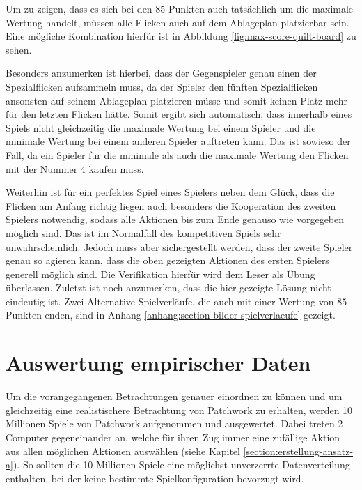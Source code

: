 Um zu zeigen, dass es sich bei den $85$ Punkten auch tatsächlich um die maximale Wertung handelt, müssen alle Flicken auch auf dem Ablageplan platzierbar sein. Eine mögliche Kombination hierfür ist in Abbildung \ref{fig:max-score-quilt-board} zu sehen.

Besonders anzumerken ist hierbei, dass der Gegenspieler genau einen der Spezialflicken aufsammeln muss, da der Spieler den fünften Spezialflicken ansonsten auf seinem Ablageplan platzieren müsse und somit keinen Platz mehr für den letzten Flicken hätte. Somit ergibt sich automatisch, dass innerhalb eines Spiels nicht gleichzeitig die maximale Wertung bei einem Spieler und die minimale Wertung bei einem anderen Spieler auftreten kann. Das ist sowieso der Fall, da ein Spieler für die minimale als auch die maximale Wertung den Flicken mit der Nummer 4 kaufen muss.

Weiterhin ist für ein perfektes Spiel eines Spielers neben dem Glück, dass die Flicken am Anfang richtig liegen auch besonders die Kooperation des zweiten Spielers notwendig, sodass alle Aktionen bis zum Ende genauso wie vorgegeben möglich sind. Das ist im Normalfall des kompetitiven Spiels sehr unwahrscheinlich. Jedoch muss aber sichergestellt werden, dass der zweite Spieler genau so agieren kann, dass die oben gezeigten Aktionen des ersten Spielers generell möglich sind. Die Verifikation hierfür wird dem Leser als Übung überlassen. Zuletzt ist noch anzumerken, dass die hier gezeigte Lösung nicht eindeutig ist. Zwei Alternative Spielverläufe, die auch mit einer Wertung von $85$ Punkten enden, sind in Anhang \ref{anhang:section-bilder-spielverlaeufe} gezeigt.

\pagebreak

\section{Auswertung empirischer Daten}
\label{section:auswertung-empirischer-daten}

Um die vorangegangenen Betrachtungen genauer einordnen zu können und um gleichzeitig eine realistischere Betrachtung von Patchwork zu erhalten, werden 10 Millionen Spiele von Patchwork aufgenommen und ausgewertet. Dabei treten 2 Computer gegeneinander an, welche für ihren Zug immer eine zufällige Aktion aus allen möglichen Aktionen auswählen (siehe Kapitel \ref{section:erstellung-ansatz-a}). So sollten die 10 Millionen Spiele eine möglichst unverzerrte Datenverteilung enthalten, bei der keine bestimmte Spielkonfiguration bevorzugt wird.

